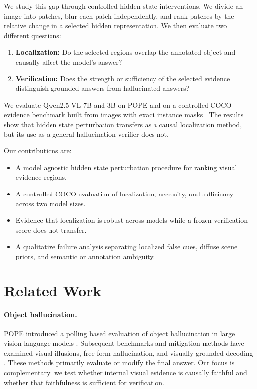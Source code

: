\documentclass{article}
\begin{document}
We study this gap through controlled hidden state interventions. We divide an image into patches, blur each patch independently, and rank patches by the relative change in a selected hidden representation. We then evaluate two different questions:

\begin{enumerate}
    \item \textbf{Localization:} Do the selected regions overlap the annotated object and causally affect the model's answer?
    \item \textbf{Verification:} Does the strength or sufficiency of the selected evidence distinguish grounded answers from hallucinated answers?
\end{enumerate}

We evaluate Qwen2.5 VL 7B and 3B \citep{bai2025qwen25vl} on POPE \citep{li2023pope} and on a controlled COCO evidence benchmark built from images with exact instance masks \citep{lin2014coco}. The results show that hidden state perturbation transfers as a causal localization method, but its use as a general hallucination verifier does not.

Our contributions are:

\begin{itemize}
    \item A model agnostic hidden state perturbation procedure for ranking visual evidence regions.
    \item A controlled COCO evaluation of localization, necessity, and sufficiency across two model sizes.
    \item Evidence that localization is robust across models while a frozen verification score does not transfer.
    \item A qualitative failure analysis separating localized false cues, diffuse scene priors, and semantic or annotation ambiguity.
\end{itemize}

\section{Related Work}

\paragraph{Object hallucination.}
POPE introduced a polling based evaluation of object hallucination in large vision language models \citep{li2023pope}. Subsequent benchmarks and mitigation methods have examined visual illusions, free form hallucination, and visually grounded decoding \citep{guan2024hallusionbench,kaul2024throne,leng2024vcd,favero2024m3id}. These methods primarily evaluate or modify the final answer. Our focus is complementary: we test whether internal visual evidence is causally faithful and whether that faithfulness is sufficient for verification.
\end{document}
